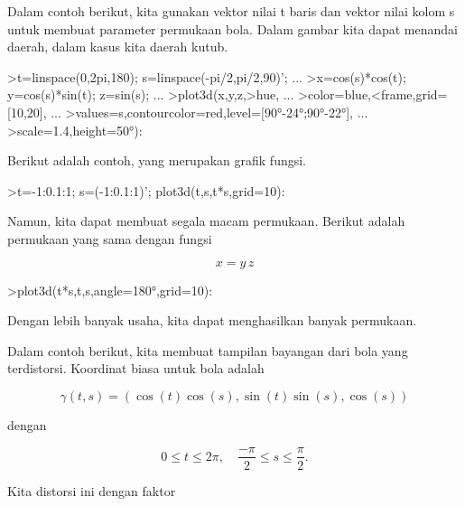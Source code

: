 \documentclass{article}
\begin{document}
\begin{eulernotebook}
\begin{eulercomment}
\begin{eulercomment}
\begin{eulercomment}
Dalam contoh berikut, kita gunakan vektor nilai t baris dan vektor
nilai kolom s untuk membuat parameter permukaan bola. Dalam gambar
kita dapat menandai daerah, dalam kasus kita daerah kutub.
\end{eulercomment}
\begin{eulerprompt}
>t=linspace(0,2pi,180); s=linspace(-pi/2,pi/2,90)'; ...
>x=cos(s)*cos(t); y=cos(s)*sin(t); z=sin(s); ...
>plot3d(x,y,z,>hue, ...
>color=blue,<frame,grid=[10,20], ...
>values=s,contourcolor=red,level=[90°-24°;90°-22°], ...
>scale=1.4,height=50°):
\end{eulerprompt}
\begin{eulercomment}
Berikut adalah contoh, yang merupakan grafik fungsi.
\end{eulercomment}
\begin{eulerprompt}
>t=-1:0.1:1; s=(-1:0.1:1)'; plot3d(t,s,t*s,grid=10):
\end{eulerprompt}
\begin{eulercomment}
Namun, kita dapat membuat segala macam permukaan. Berikut adalah
permukaan yang sama dengan fungsi

\end{eulercomment}
\begin{eulerformula}
\[
x = y \, z
\]
\end{eulerformula}
\begin{eulerprompt}
>plot3d(t*s,t,s,angle=180°,grid=10):
\end{eulerprompt}
\begin{eulercomment}
Dengan lebih banyak usaha, kita dapat menghasilkan banyak permukaan.

Dalam contoh berikut, kita membuat tampilan bayangan dari bola yang
terdistorsi. Koordinat biasa untuk bola adalah

\end{eulercomment}
\begin{eulerformula}
\[
\gamma(t,s) = (\cos(t)\cos(s),\sin(t)\sin(s),\cos(s))
\]
\end{eulerformula}
\begin{eulercomment}
dengan

\end{eulercomment}
\begin{eulerformula}
\[
0 \le t \le 2\pi, \quad \frac{-\pi}{2} \le s \le \frac{\pi}{2}.
\]
\end{eulerformula}
\begin{eulercomment}
Kita distorsi ini dengan faktor


\end{eulercomment}
\end{eulercomment}
\end{eulercomment}
\end{eulernotebook}
\end{document}
